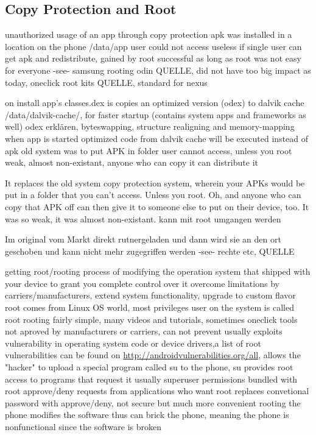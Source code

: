 \subsection{Copy Protection and Root} \label{subsection:android-copyroot}
unauthorized usage of an app through copy protection
apk was installed in a location on the phone /data/app user could not access
useless if single user can get apk and redistribute, gained by root
successful as long as root was not easy for everyone -see- samsung rooting odin QUELLE, did not have too big impact as today, oneclick root kits QUELLE, standard for nexus

on install app's classes.dex is copies an optimized version (odex) to dalvik cache /data/dalvik-cache/, for faster startup (contains system apps and frameworks as well)
odex erklären, byteswapping, structure realigning and memory-mapping
when app is started optimized code from dalvik cache will be executed instead of apk
old system was to put APK in folder user cannot access, unless you root
weak, almost non-existant, anyone who can copy it can distribute it

It replaces the old system copy protection system, wherein your APKs would be put in a folder that you can't access. Unless you root. Oh, and anyone who can copy that APK off can then give it to someone else to put on their device, too. It was so weak, it was almost non-existant.
kann mit root umgangen werden

Im original vom Markt direkt rutnergeladen und dann wird sie an den ort geschoben und kann nicht mehr zugegriffen werden -see- rechte etc, QUELLE



getting root/rooting process of modifying the operation system that shipped with your device to grant you complete control over it
overcome limitations by carriers/manufacturers, extend system functionality, upgrade to custom flavor
root comes from Linux OS world, most privileges user on the system is called root
rooting fairly simple, many videos and tutorials, sometimes oneclick tools
not aproved by manufacturers or carriers, can not prevent usually exploits vulnerability in operating system code or device drivers,a list of root vulnerabilities can be found on \url{http://androidvulnerabilities.org/all}, allows the "hacker" to upload a special program called su to the phone,
su provides root access to programs that request it
usually superuser permissions bundled with root
approve/deny requests from applications who want root
replaces convetional password with approve/deny, not secure but much more convenient
rooting the phone modifies the software thus can brick the phone, meaning the phone is nonfunctional since the software is broken

